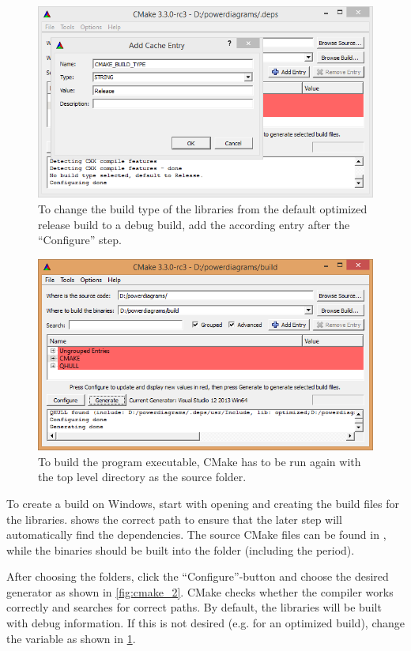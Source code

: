 \begin{figure}[p]
    \centering
    \includegraphics[width=0.9\linewidth]{cmake_3.png}
    \caption{To change the build type of the libraries from the default optimized release build to a debug build, add the according entry after the \enquote{Configure} step.}
    \label{fig:cmake_3}
\end{figure}
\begin{figure}[p]
    \centering
    \includegraphics[width=0.9\linewidth]{cmake_4.png}
    \caption{To build the program executable, CMake has to be run again with the top level directory as the source folder.}
    \label{fig:cmake_4}
\end{figure}

To create a build on Windows, start with opening  and creating the build files for the libraries.
 shows the correct path to ensure that the later step will automatically find the dependencies.
The source CMake files can be found in , while the binaries should be built into the folder  (including the period).

After choosing the folders, click the \enquote{Configure}-button and choose the desired generator as shown in \cref{fig:cmake_2}.
CMake checks whether the compiler works correctly and searches for correct paths.
By default, the libraries will be built with debug information.
If this is not desired (e.g. for an optimized build), change the  variable as shown in \cref{fig:cmake_3}.

